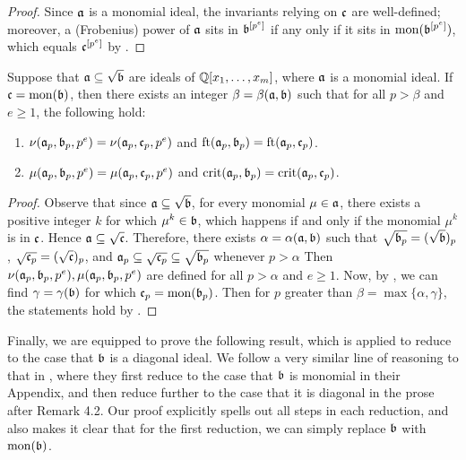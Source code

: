 \documentclass[11pt]{amsart}
\begin{document}
\begin{proof}
Since $\mathfrak{a}$ is a monomial ideal, the invariants relying on $\mathfrak{c}$ are well-defined; moreover, 
a (Frobenius) power of $\mathfrak{a}$ sits in $\mathfrak{b}^{[p^e]}$ if any only if it sits in $\operatorname{mon}(\mathfrak{b}^{[p^e]})$, which equals
$\mathfrak{c}^{[p^e]}$ by .
 \end{proof}

 
\begin{corollary} \label{nu-mu-reduce-monomial: C}
Suppose that $\mathfrak{a} \subseteq \sqrt{\mathfrak{b}}$ are ideals of $\mathbb{Q}[x_1, \ldots, x_m]$, where $\mathfrak{a}$ is a monomial ideal. If $\mathfrak{c} = \operatorname{mon}(\mathfrak{b})$, then there exists an integer $\beta = \beta(\mathfrak{a}, \mathfrak{b})$ such that for all $p > \beta$ and $e \geq 1$, the following hold:
\begin{enumerate}
\item $\nu(\mathfrak{a}_p, \mathfrak{b}_p, p^e) = \nu(\mathfrak{a}_p, \mathfrak{c}_p, p^e)$ and $\operatorname{ft}(\mathfrak{a}_p, \mathfrak{b}_p) = \operatorname{ft}(\mathfrak{a}_p, \mathfrak{c}_p)$.
\item $\mu(\mathfrak{a}_p, \mathfrak{b}_p, p^e) = \mu(\mathfrak{a}_p, \mathfrak{c}_p, p^e)$ and $\operatorname{crit}(\mathfrak{a}_p,\mathfrak{b}_p) = \operatorname{crit}(\mathfrak{a}_p,\mathfrak{c}_p)$. 
\end{enumerate}
\end{corollary}


\begin{proof}
Observe that since $\mathfrak{a} \subseteq \sqrt{\mathfrak{b}}$, for every monomial $\mu \in \mathfrak{a}$, there exists a positive integer $k$ for which $\mu^k \in \mathfrak{b}$, which happens if and only if the monomial $\mu^k$ is in $\mathfrak{c}$.  Hence $\mathfrak{a} \subseteq \sqrt{\mathfrak{c}}$.
Therefore, there exists $\alpha = \alpha(\mathfrak{a}, \mathfrak{b})$ such that 
$\sqrt{\mathfrak{b}_p} = (\sqrt{\mathfrak{b}})_p$, $\sqrt{\mathfrak{c}_p} = (\sqrt{\mathfrak{c}})_p$, and 
 $\mathfrak{a}_p \subseteq \sqrt{\mathfrak{c}_p} \subseteq 
\sqrt{\mathfrak{b}_p}$ whenever $p > \alpha$
Then
$\nu(\mathfrak{a}_p, \mathfrak{b}_p, p^e), \mu(\mathfrak{a}_p, \mathfrak{b}_p, p^e)$ are defined for all $p > \alpha$ and $e \geq 1$. 
Now, by , we can find $\gamma = \gamma(\mathfrak{b})$ for which $\mathfrak{c}_p = \operatorname{mon}(\mathfrak{b}_p)$.  Then for $p$ greater than $\beta = \max\{ \alpha, \gamma \}$, the statements hold by .
\end{proof}


Finally, we are equipped to prove the following result, which is applied to reduce  to the case that $\mathfrak{b}$ is a diagonal ideal. We follow a very similar line of reasoning to that in \cite{budur+mustata+saito.roots_bs_polys_monomial}, where they first reduce to the case that $\mathfrak{b}$ is monomial in their Appendix, and then reduce further to the case that it is diagonal in the prose after Remark 4.2.  
Our proof explicitly spells out all steps in each reduction, 
and also makes it clear that for the first reduction, we can simply replace $\mathfrak{b}$ with $\operatorname{mon}(\mathfrak{b})$.
\end{document}
